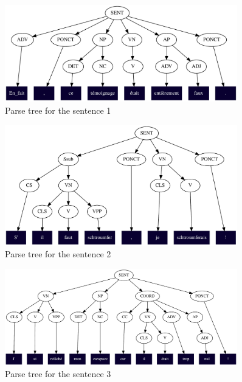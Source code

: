 \documentclass[a4paper, 11pt]{article}
\newcommand{\colbad}[1]{\textcolor{BrickRed} {#1}}
\begin{document}

\begin{figure}[h]
  \centering
  \includegraphics[width=0.9\textwidth]{sent1}
  \caption{Parse tree for the sentence 1}\label{fig:sent1}
\end{figure}

\begin{figure}[h]
  \centering
  \includegraphics[width=0.9\textwidth]{sent2}
  \caption{Parse tree for the sentence 2}\label{fig:sent2}
\end{figure}

\begin{figure}[h]
  \centering
  \includegraphics[width=0.9\textwidth]{sent3}
  \caption{Parse tree for the sentence 3}\label{fig:sent3}
\end{figure}
\end{document}
